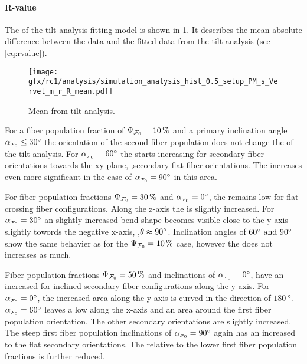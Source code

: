 \paragraph{R-value}
% 
The \rvalue{} of the tilt analysis fitting model is shown in \cref{fig:sim_ana_rvalue}.
It describes the mean absolute difference between the data and the fitted data from the tilt analysis (see \cref{eq:rvalue}).
\par
% 
\begin{figure}[!p]
\centering
\texttt{[image: gfx/rc1/analysis/simulation\_analysis\_hist\_0.5\_setup\_PM\_s\_Vervet\_m\_r\_R\_mean.pdf]}
\caption{Mean \rvalue{} from tilt analysis.}
\label{fig:sim_ana_rvalue}
\end{figure}
%
For a fiber population fraction of $\textnormal{$\Psi_{\textnormal{$\mathcal{F}_0$}}$}=\SI{10}{\percent}$ and a primary inclination angle $\modelInc\leq\SI{30}{\degree}$ the orientation of the second fiber population does not change the \rvalue{} of the tilt analysis.
For $\modelInc=\SI{60}{\degree}$ the \rvalue{} starts increasing for secondary fiber orientations towards the xy-plane, \ie{},secondary flat fiber orientations.
The \rvalue{} increases even more significant in the case of $\modelInc=\SI{90}{\degree}$ in this area. 
\par
% 
For fiber population fractions $\textnormal{$\Psi_{\textnormal{$\mathcal{F}_0$}}$}=\SI{30}{\percent}$ and $\modelInc=\SI{0}{\degree}$, the \rvalue{} remains low for flat crossing fiber configurations.
Along the z-axis the \rvalue{} is slightly increased.
For $\modelInc=\SI{30}{\degree}$ an slightly increased bend shape becomes visible close to the y-axis slightly towords the negative x-axis, \ie{},$\textnormal{$\theta$} \approx \SI{90}{\degree}$.
Inclination angles of $\SIlist{60;90}{\degree}$ show the same behavier as for the $\textnormal{$\Psi_{\textnormal{$\mathcal{F}_0$}}$}=\SI{10}{\percent}$ case, however the \rvalue does not increases as much.
\par
%
Fiber population fractions $\textnormal{$\Psi_{\textnormal{$\mathcal{F}_0$}}$}=\SI{50}{\percent}$ and inclinations of $\modelInc=\SI{0}{\degree}$, have an increased \rvalue{} for inclined secondary fiber configurations along the y-axis.
For $\modelInc=\SI{0}{\degree}$, the increased area along the y-axis is curved in the direction of $\SI{180}{\degree}$.
$\modelInc=\SI{60}{\degree}$ leaves a low \rvalue{} along the x-axis and an area around the first fiber population orientation.
The other secondary orientations are slightly increased.
The steep first fiber population inclinations of $\modelInc=\SI{90}{\degree}$ again has an increased \rvalue{} to the flat secondary orientations.
The \rvalue{} relative to the lower first fiber population fractions is further reduced.
